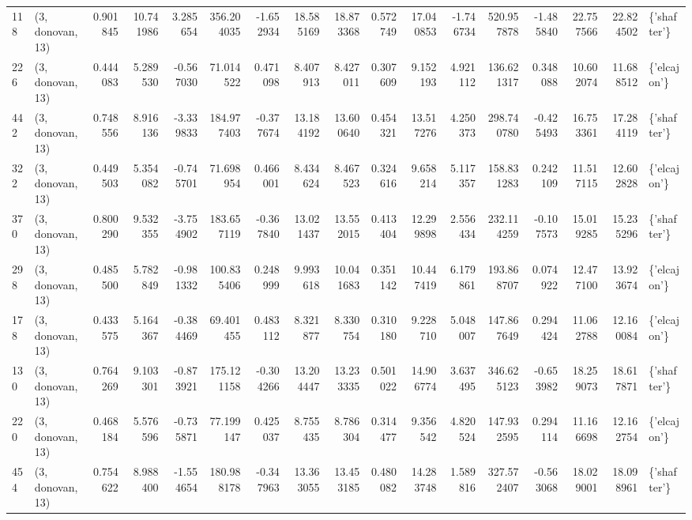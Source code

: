 \begin{tabular}{llrrrrrrrrrrrrrrl}
118 &  (3, donovan, 13) &   0.901845 &  10.741986 &   3.285654 &   356.204035 &  -1.652934 &  18.585169 &  18.873368 &  0.572749 &  17.040853 &  -1.746734 &   520.957878 &  -1.485840 &  22.757566 &  22.824502 &  \{'shafter'\} \\
226 &  (3, donovan, 13) &   0.444083 &   5.289530 &  -0.567030 &    71.014522 &   0.471098 &   8.407913 &   8.427011 &  0.307609 &   9.152193 &   4.921112 &   136.621317 &   0.348088 &  10.602074 &  11.688512 &  \{'elcajon'\} \\
442 &  (3, donovan, 13) &   0.748556 &   8.916136 &  -3.339833 &   184.977403 &  -0.377674 &  13.184192 &  13.600640 &  0.454321 &  13.517276 &   4.250373 &   298.740780 &  -0.425493 &  16.753361 &  17.284119 &  \{'shafter'\} \\
322 &  (3, donovan, 13) &   0.449503 &   5.354082 &  -0.745701 &    71.698954 &   0.466001 &   8.434624 &   8.467523 &  0.324616 &   9.658214 &   5.117357 &   158.831283 &   0.242109 &  11.517115 &  12.602828 &  \{'elcajon'\} \\
370 &  (3, donovan, 13) &   0.800290 &   9.532355 &  -3.754902 &   183.657119 &  -0.367840 &  13.021437 &  13.552015 &  0.413404 &  12.299898 &   2.556434 &   232.114259 &  -0.107573 &  15.019285 &  15.235296 &  \{'shafter'\} \\
298 &  (3, donovan, 13) &   0.485500 &   5.782849 &  -0.981332 &   100.835406 &   0.248999 &   9.993618 &  10.041683 &  0.351142 &  10.447419 &   6.179861 &   193.868707 &   0.074922 &  12.477100 &  13.923674 &  \{'elcajon'\} \\
178 &  (3, donovan, 13) &   0.433575 &   5.164367 &  -0.384469 &    69.401455 &   0.483112 &   8.321877 &   8.330754 &  0.310180 &   9.228710 &   5.048007 &   147.867649 &   0.294424 &  11.062788 &  12.160084 &  \{'elcajon'\} \\
130 &  (3, donovan, 13) &   0.764269 &   9.103301 &  -0.873921 &   175.121158 &  -0.304266 &  13.204447 &  13.233335 &  0.501022 &  14.906774 &   3.637495 &   346.625123 &  -0.653982 &  18.259073 &  18.617871 &  \{'shafter'\} \\
220 &  (3, donovan, 13) &   0.468184 &   5.576596 &  -0.735871 &    77.199147 &   0.425037 &   8.755435 &   8.786304 &  0.314477 &   9.356542 &   4.820524 &   147.932595 &   0.294114 &  11.166698 &  12.162754 &  \{'elcajon'\} \\
454 &  (3, donovan, 13) &   0.754622 &   8.988400 &  -1.554654 &   180.988178 &  -0.347963 &  13.363055 &  13.453185 &  0.480082 &  14.283748 &   1.589816 &   327.572407 &  -0.563068 &  18.029001 &  18.098961 &  \{'shafter'\} \\

\end{tabular}
